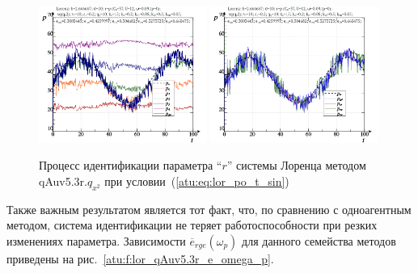 \begin{figure}[h!]
  \centerline{
    \includegraphics[width=0.49\textwidth]{p/cha/lor/qAuv5.3r/lor_qAuv5_3r_qy2-p_t_pi_sin.png}
    \hfill
    \includegraphics[width=0.49\textwidth]{p/cha/lor/qAuv5.3r/lor_qAuv5_3r_qy2-p_t_pz_sin.png}
  }
  \caption{Процесс идентификации параметра ``$r$'' системы Лоренца методом qAuv5.3r.$q_{x^2}$ при условии~(\ref{atu:eq:lor_po_t_sin})}
  \label{atu:f:lor_id_qAuv5.3r.q_y2_sin}
\end{figure}

Также важным результатом является тот факт, что, по сравнению с одноагентным методом,
система идентификации не теряет работоспособности
при резких изменениях параметра. Зависимости $\overline{e}_{rge}(\omega_p)$
для данного семейства методов приведены на рис.~\ref{atu:f:lor_qAuv5.3r_e_omega_p}.


